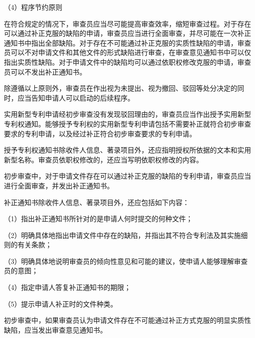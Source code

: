 {\setlength{\parindent}{17.1bp}（4）程序节约原则\par}

在符合规定的情况下，审查员应当尽可能提高审查效率，缩短审查过程。对于存在可以通过补正克服的缺陷的申请，审查员应当进行全面审查，并尽可能在一次补正通知书中指出全部缺陷。对于存在不可能通过补正克服的实质性缺陷的申请，审查员可以不对申请文件和其他文件的形式缺陷进行审查，在审查意见通知书中可以仅指出实质性缺陷。对于申请文件中的缺陷均可以通过依职权修改克服的申请，审查员可以不发出补正通知书。

除遵循以上原则外，审查员在作出视为未提出、视为撤回、驳回等处分决定的同时，应当告知申请人可以启动的后续程序。

实用新型专利申请经初步审查没有发现驳回理由的，审查员应当作出授予实用新型专利权通知。能够授予专利权的实用新型专利申请包括不需要补正就符合初步审查要求的专利申请，以及经过补正符合初步审查要求的专利申请。

授予专利权通知书除收件人信息、著录项目外，还应指明授权所依据的文本和实用新型名称。审查员依职权修改的，还应当写明依职权修改的内容。

初步审查中，对于申请文件存在可以通过补正克服的缺陷的专利申请，审查员应当进行全面审查，并发出补正通知书。

补正通知书除收件人信息、著录项目外，还应包括如下内容：

{\setlength{\parindent}{17.1bp}（1）指出补正通知书所针对的是申请人何时提交的何种文件；\par}

{\setlength{\parindent}{17.1bp}（2）明确具体地指出申请文件中存在的缺陷，并指出其不符合专利法及其实施细则的有关条款；\par}

{\setlength{\parindent}{17.1bp}（3）明确具体地说明审查员的倾向性意见和可能的建议，使申请人能够理解审查员的意图；\par}

{\setlength{\parindent}{17.1bp}（4）指定申请人答复补正通知书的期限；\par}

{\setlength{\parindent}{17.1bp}（5）提示申请人补正时的文件种类。\par}

初步审查中，如果审查员认为申请文件存在不可能通过补正方式克服的明显实质性缺陷，应当发出审查意见通知书。

